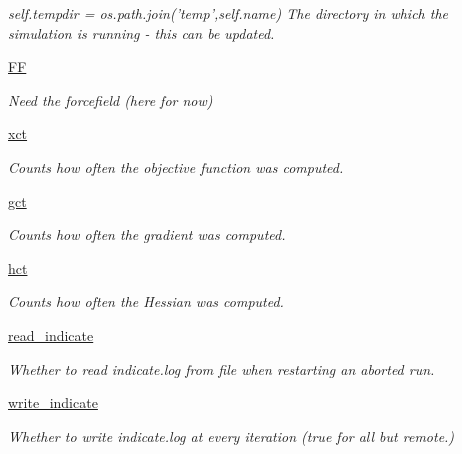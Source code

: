 \begin{DoxyCompactItemize}
\begin{DoxyCompactList}\small\item\em self.\-tempdir = os.\-path.\-join('temp',self.\-name) The directory in which the simulation is running -\/ this can be updated. \end{DoxyCompactList}\item 
\hyperlink{classforcebalance_1_1target_1_1Target_a38a37919783141ea37fdcf8b00ce0aaf}{F\-F}
\begin{DoxyCompactList}\small\item\em Need the forcefield (here for now) \end{DoxyCompactList}\item 
\hyperlink{classforcebalance_1_1target_1_1Target_aad2e385cfbf7b4a68f1c2cb41133fe82}{xct}
\begin{DoxyCompactList}\small\item\em Counts how often the objective function was computed. \end{DoxyCompactList}\item 
\hyperlink{classforcebalance_1_1target_1_1Target_aa625ac88c6744eb14ef281d9496d0dbb}{gct}
\begin{DoxyCompactList}\small\item\em Counts how often the gradient was computed. \end{DoxyCompactList}\item 
\hyperlink{classforcebalance_1_1target_1_1Target_a5b5a42f78052b47f29ed4b940c6111a1}{hct}
\begin{DoxyCompactList}\small\item\em Counts how often the Hessian was computed. \end{DoxyCompactList}\item 
\hyperlink{classforcebalance_1_1target_1_1Target_aa8af57d5be669c4bb1c0cfd4b7a9220e}{read\-\_\-indicate}
\begin{DoxyCompactList}\small\item\em Whether to read indicate.\-log from file when restarting an aborted run. \end{DoxyCompactList}\item 
\hyperlink{classforcebalance_1_1target_1_1Target_a3a2f5d4bbb8d6ecb580eadb261977a57}{write\-\_\-indicate}
\begin{DoxyCompactList}\small\item\em Whether to write indicate.\-log at every iteration (true for all but remote.) \end{DoxyCompactList}\item 

\end{DoxyCompactItemize}
